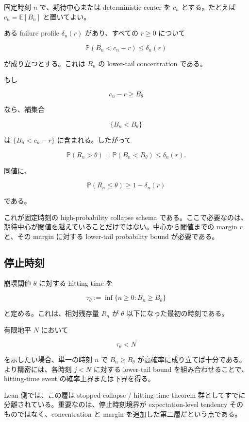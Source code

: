 \documentclass[12pt,a4paper]{article}
\begin{document}
固定時刻 \(n\) で、期待中心または deterministic center を \(c_{n}\) とする。たとえば \(c_{n}=\mathbb E[B_{n}]\) と置いてよい。

ある failure profile \(\delta_{n}(r)\) があり、すべての \(r\ge 0\) について

\[
\mathbb P(B_{n} < c_{n}-r) \le \delta_{n}(r)
\]

が成り立つとする。これは \(B_{n}\) の lower-tail concentration である。

もし

\[
c_{n}-r \ge B_\theta
\]

なら、補集合

\[
\{B_{n} < B_\theta\}
\]

は \(\{B_{n} < c_{n}-r\}\) に含まれる。したがって

\[
\mathbb P(R_{n} > \theta) = \mathbb P(B_{n} < B_\theta) \le \delta_{n}(r).
\]

同値に、

\[
\mathbb P(R_{n} \le \theta) \ge 1-\delta_{n}(r)
\]

である。

これが固定時刻の high-probability collapse schema である。ここで必要なのは、期待中心が閾値を越えていることだけではない。中心から閾値までの margin \(r\) と、その margin に対する lower-tail probability bound が必要である。

\subsection{停止時刻}\label{ux505cux6b62ux6642ux523b}

崩壊閾値 \(\theta\) に対する hitting time を

\[
\tau_\theta := \inf\{n \ge 0 : B_{n} \ge B_\theta\}
\]

と定める。これは、相対残存量 \(R_{n}\) が \(\theta\) 以下になった最初の時刻である。

有限地平 \(N\) において

\[
\tau_\theta < N
\]

を示したい場合、単一の時刻 \(n\) で \(B_{n}\ge B_\theta\) が高確率に成り立てば十分である。より精密には、各時刻 \(j<N\) に対する lower-tail bound を組み合わせることで、hitting-time event の確率上界または下界を得る。

Lean 側では、この層は stopped-collapse / hitting-time theorem 群としてすでに分離されている。重要なのは、停止時刻境界が expectation-level tendency そのものではなく、concentration と margin を追加した第二層だという点である。
\end{document}
